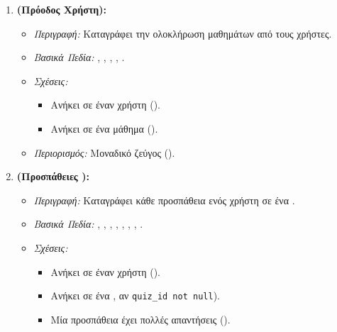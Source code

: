 \begin{enumerate}[leftmargin=*, label=\arabic*., wide, labelwidth=!, labelindent=0pt, itemsep=1ex]
    \item \textbf{\texttt{} (Πρόοδος Χρήστη):}
        \begin{itemize}[leftmargin=1.5em, noitemsep]
            \item \textit{Περιγραφή:} Καταγράφει την ολοκλήρωση μαθημάτων από τους χρήστες.
            \item \textit{Βασικά Πεδία:} \texttt{}, \texttt{}, \texttt{}, \texttt{}, \texttt{}.
            \item \textit{Σχέσεις:}
            \begin{itemize}[leftmargin=1.5em, noitemsep]
                \item Ανήκει σε έναν χρήστη ().
                \item Ανήκει σε ένα μάθημα ().
            \end{itemize}
            \item \textit{Περιορισμός:} Μοναδικό ζεύγος (\texttt{}).
        \end{itemize}

    \item \textbf{\texttt{} (Προσπάθειες ):}
        \begin{itemize}[leftmargin=1.5em, noitemsep]
            \item \textit{Περιγραφή:} Καταγράφει κάθε προσπάθεια ενός χρήστη σε ένα .
            \item \textit{Βασικά Πεδία:} \texttt{}, \texttt{}, \texttt{}, \texttt{}, \texttt{}, \texttt{}, \texttt{}, \texttt{}.
            \item \textit{Σχέσεις:}
            \begin{itemize}[leftmargin=1.5em, noitemsep]
                \item Ανήκει σε έναν χρήστη ().
                \item Ανήκει σε ένα , αν \texttt{quiz\_id not null}).
                \item Μία προσπάθεια έχει πολλές απαντήσεις ().
            \end{itemize}
        \end{itemize}


\end{enumerate}
